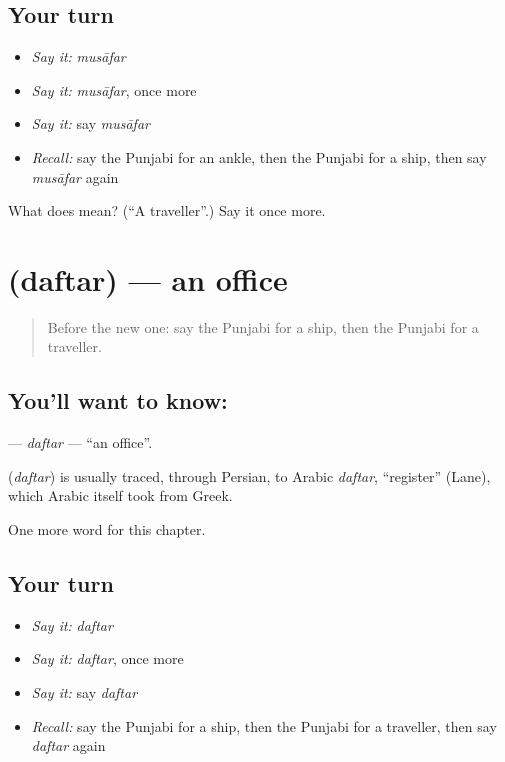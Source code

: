 \subsection*{Your turn}
\begin{itemize}
\raggedright
  \item \emph{Say it:} \emph{musāfar}
  \item \emph{Say it:} \emph{musāfar}, once more
  \item \emph{Say it:} say \emph{musāfar}
  \item \emph{Recall:} say the Punjabi for an ankle, then the Punjabi for a ship, then say \emph{musāfar} again
\end{itemize}

\begin{tcolorbox}[breakable,colback=teal!4,colframe=teal!35!black,title={Before you move on}]
What does  mean? (\textquotedblleft{}A traveller\textquotedblright{}.) Say it once more.
\end{tcolorbox}
\section[\texorpdfstring{\pa{ਦਫ਼ਤਰ} (daftar)}{ਦਫ਼ਤਰ (daftar)}]{ (daftar) — an office}

\label{lesson:PA-C137-daftar}



\begin{quote}
Before the new one: say the Punjabi for a ship, then the Punjabi for a traveller.
\end{quote}

\subsection*{You'll want to know: }
\textbf{} — \emph{daftar} — \textquotedblleft{}an office\textquotedblright{}.

\begin{cousinweb}
\textbf{} (\emph{daftar}) is usually traced, through Persian, to Arabic \emph{daftar}, \textquotedblleft{}register\textquotedblright{} (Lane), which Arabic itself took from Greek.
\end{cousinweb}

\begin{grammarlens}[title={What you've built}]
One more word for this chapter.
\end{grammarlens}

\subsection*{Your turn}
\begin{itemize}
\raggedright
  \item \emph{Say it:} \emph{daftar}
  \item \emph{Say it:} \emph{daftar}, once more
  \item \emph{Say it:} say \emph{daftar}
  \item \emph{Recall:} say the Punjabi for a ship, then the Punjabi for a traveller, then say \emph{daftar} again
\end{itemize}

